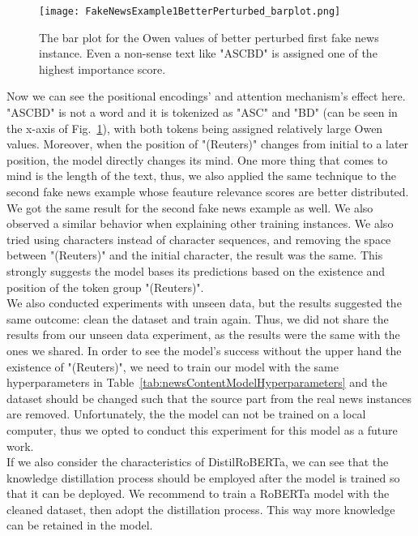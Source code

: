 \begin{figure}
    \centering
    \texttt{[image: FakeNewsExample1BetterPerturbed\_barplot.png]}
    \caption[The bar plot for the Owen values of better perturbed first fake news instance.]{The bar plot for the Owen values of better perturbed first fake news instance. Even a non-sense text like "ASCBD" is assigned one of the highest importance score.}
    \label{fig:FakeNewsExample1BetterPerturbed_barplot}
\end{figure}
Now we can see the positional encodings' and attention mechanism's effect here. "ASCBD" is not a word and it is tokenized as "ASC" and "BD" (can be seen in the x-axis of Fig.~\ref{fig:FakeNewsExample1BetterPerturbed_barplot}), with both tokens being assigned relatively large Owen values. Moreover, when the position of "(Reuters)" changes from initial to a later position, the model directly changes its mind. One more thing that comes to mind is the length of the text, thus, we also applied the same technique to the second fake news example whose feauture relevance scores are better distributed. We got the same result for the second fake news example as well. We also observed a similar behavior when explaining other training instances. We also tried using characters instead of character sequences, and removing the space between "(Reuters)" and the initial character, the result was the same. This strongly suggests the model bases its predictions based on the existence and position of the token group "(Reuters)".\\
We also conducted experiments with unseen data, but the results suggested the same outcome: clean the dataset and train again. Thus, we did not share the results from our unseen data experiment, as the results were the same with the ones we shared. In order to see the model's success without the upper hand the existence of "(Reuters)", we need to train our model with the same hyperparameters in Table~\ref{tab:newsContentModelHyperparameters} and the dataset should be changed such that the source part from the real news instances are removed. Unfortunately, the the model can not be trained on a local computer, thus we opted to conduct this experiment for this model as a future work.\\
If we also consider the characteristics of DistilRoBERTa, we can see that the knowledge distillation process should be employed after the model is trained so that it can be deployed. We recommend to train a RoBERTa model with the cleaned dataset, then adopt the distillation process. This way more knowledge can be retained in the model.\\
